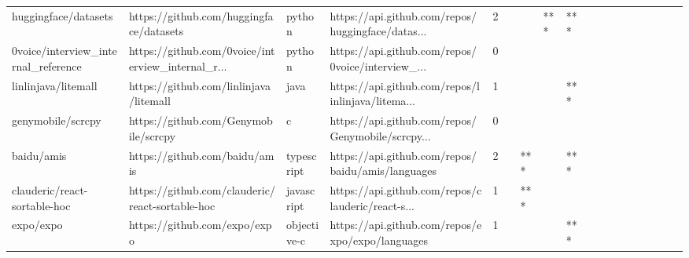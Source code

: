\begin{tabular}{llllrlllllllllllll}
huggingface/datasets                               &            https://github.com/huggingface/datasets &            python &  https://api.github.com/repos/huggingface/datas... &       2 &         &        &       *** &            *** &                 &        &           &           &          &          &       &              &          \\
0voice/interview\_internal\_reference                &  https://github.com/0voice/interview\_internal\_r... &            python &  https://api.github.com/repos/0voice/interview\_... &       0 &         &        &           &                &                 &        &           &           &          &          &       &              &          \\
linlinjava/litemall                                &             https://github.com/linlinjava/litemall &              java &  https://api.github.com/repos/linlinjava/litema... &       1 &         &        &           &            *** &                 &        &           &           &          &          &       &              &          \\
genymobile/scrcpy                                  &               https://github.com/Genymobile/scrcpy &                 c &  https://api.github.com/repos/Genymobile/scrcpy... &       0 &         &        &           &                &                 &        &           &           &          &          &       &              &          \\
baidu/amis                                         &                      https://github.com/baidu/amis &        typescript &  https://api.github.com/repos/baidu/amis/languages &       2 &         &    *** &           &            *** &                 &        &           &           &          &          &       &              &          \\
clauderic/react-sortable-hoc                       &    https://github.com/clauderic/react-sortable-hoc &        javascript &  https://api.github.com/repos/clauderic/react-s... &       1 &         &    *** &           &                &                 &        &           &           &          &          &       &              &          \\
expo/expo                                          &                       https://github.com/expo/expo &       objective-c &   https://api.github.com/repos/expo/expo/languages &       1 &         &        &           &            *** &                 &        &           &           &          &          &       &              &          \\

\end{tabular}
